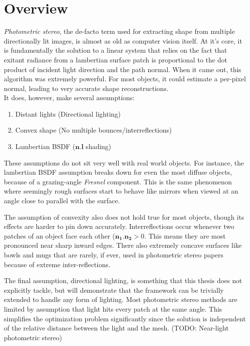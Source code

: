 \section{Overview}
{\it Photometric stereo}, the de-facto term used for extracting shape from multiple directionally lit images, is almost as old as computer vision itself. At it's core, it is fundamentally the solution to a linear system that relies on the fact that exitant radiance from a lambertian surface patch is proportional to the dot product of incident light direction and the path normal. When it came out, this algorithm was extremely powerful. For most objects, it could estimate a per-pixel normal, leading to very accurate shape reconstructions.\\
It does, however, make several assumptions:
\begin{enumerate}
    \item Distant lights (Directional lighting)
    \item Convex shape (No multiple bounces/interreflections)
    \item Lambertian BSDF ($\mathbf{n}.\mathbf{l}$ shading)
\end{enumerate}

These assumptions do not sit very well with real world objects. For instance, the lambertian BSDF assumption breaks down for even the most diffuse objects, because of a grazing-angle \textit{Fresnel} component. This is the same phenomenon where seemingly rough surfaces start to behave like mirrors when viewed at an angle close to parallel with the surface.

The assumption of convexity also does not hold true for most objects, though its effects are harder to pin down accurately. Interreflections occur whenever two patches of an object face each other ($\mathbf{n_1}.\mathbf{n_2} > 0$. This means they are most pronounced near sharp inward edges. There also extremely concave surfaces like bowls and mugs that are rarely, if ever, used in photometric stereo papers because of extreme inter-reflections.

The final assumption, directional lighting, is something that this thesis does not explicitly tackle, but will demonstrate that the framework can be trivially extended to handle any form of lighting. Most photometric stereo methods are limited by assumption that light hits every patch at the same angle. This simplifies the optimization problem significantly since the solution is independent of the relative distance between the light and the mesh. (TODO: Near-light photometric stereo)

